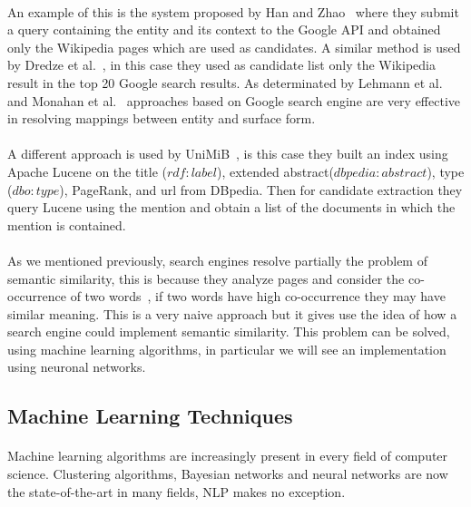 \paragraph{}
An example of this is the system proposed by Han and Zhao~\cite{han2009nlpr_kbp} where they submit a query containing the entity and its context to the Google API and obtained only the Wikipedia pages which are used as candidates. A similar method is used by Dredze et al.~\cite{dredze2010entity}, in this case they used as candidate list only the Wikipedia result in the top 20 Google search results. As determinated by Lehmann et al.~\cite{lehmann2010lcc} and Monahan et al.~\cite{monahan2011cross} approaches based on Google search engine are very effective in resolving mappings between entity and surface form.

\paragraph{}
A different approach is used by UniMiB~\cite{caliano2016unimib}, is this case they built an index using Apache Lucene on the title ($rdf:label$), extended abstract\break($dbpedia:abstract$), type ($dbo:type$), PageRank, and url from DBpedia. Then for candidate extraction they query Lucene using the mention and obtain a list of the documents in which the mention is contained.

\paragraph{}
As we mentioned previously, search engines resolve partially the problem of semantic similarity, this is because they analyze pages and consider the co-occurrence of two words~\cite{bollegala2007measuring}, if two words have high co-occurrence they may have similar meaning. This is a very naive approach but it gives use the idea of how a search engine could implement semantic similarity. This problem can be solved, using machine learning algorithms, in particular we will see an implementation using neuronal networks. 


\subsection{Machine Learning Techniques}
\paragraph{}
Machine learning algorithms are increasingly present in every field of computer science. Clustering algorithms, Bayesian networks and neural networks are now the state-of-the-art in many fields, NLP makes no exception.

